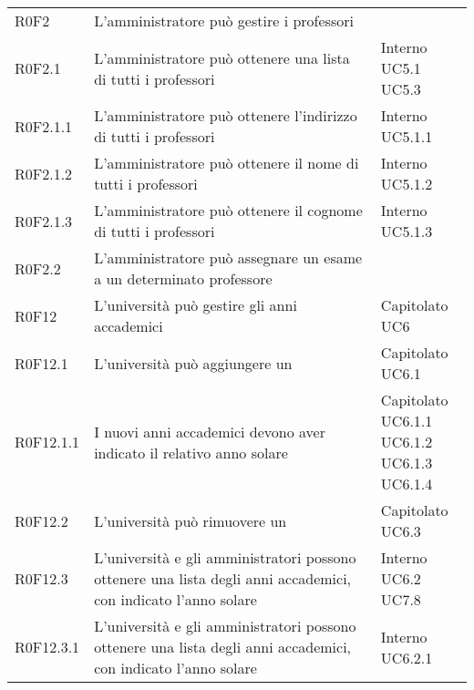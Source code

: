 \documentclass[AnalisiDeiRequisiti.tex]{subfiles}
\begin{document}
\begin{longtable}[H]{p{2cm}p{5.2cm}p{5cm}}
	R0F2 & L'amministratore può gestire i professori & \makecell[tl]{
		Interno
	} \\
	R0F2.1 & L'amministratore può ottenere una lista di tutti i professori & \makecell[tl]{
		Interno \\ 
		UC5.1 \\
		UC5.3 
	} \\
	R0F2.1.1 & L'amministratore può ottenere l'indirizzo di tutti i professori & \makecell[tl]{
		Interno \\ 
		UC5.1.1
	} \\
	R0F2.1.2 & L'amministratore può ottenere il nome di tutti i professori & \makecell[tl]{
		Interno \\ 
		UC5.1.2
	} \\
	R0F2.1.3 & L'amministratore può ottenere il cognome di tutti i professori & \makecell[tl]{
		Interno \\ 
		UC5.1.3
	} \\
	R0F2.2 & L'amministratore può assegnare un esame a un determinato professore & \makecell[tl]{
		Capitolato
	} \\
	R0F12& L'università può gestire gli anni accademici & \makecell[tl]{
		Capitolato \\ 
		UC6
	} \\
	R0F12.1 & L'università può aggiungere un \citGloss{anno accademico} & \makecell[tl]{
		Capitolato \\ 
		UC6.1 \\ 
	} \\
	R0F12.1.1 & I nuovi anni accademici devono aver indicato il relativo anno solare  & \makecell[tl]{
		Capitolato \\ 
		UC6.1.1 \\
		UC6.1.2 \\ 
		UC6.1.3
		UC6.1.4
	} \\
	R0F12.2 & L'università può rimuovere un \citGloss{anno accademico} & \makecell[tl]{
	Capitolato \\ 
	UC6.3
	} \\
	R0F12.3 &  L'università e gli amministratori possono ottenere una lista degli anni accademici, con indicato l'anno solare & \makecell[tl]{
		Interno \\ 
		UC6.2 \\
		UC7.8
	} \\ 
	R0F12.3.1 &  L'università e gli amministratori possono ottenere una lista degli anni accademici, con indicato l'anno solare & \makecell[tl]{
	Interno \\ 
	UC6.2.1 \\
}
\end{longtable}
\end{document}
